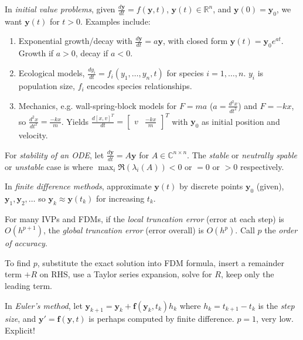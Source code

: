 \documentclass[landscape,10pt,letterpaper]{article}
\begin{document}
\begin{multicols}{4}
In \emph{initial value problems}, given $\frac{d \mathbf{y}}{dt} = f(\mathbf{y}, t)$, $\mathbf{y}(t) \in \mathbb{R}^n$, and $\mathbf{y}(0) = \mathbf{y}_0$, we want $\mathbf{y}(t)$ for $t > 0$.  Examples include:

\begin{enumerate}[topsep=0pt, partopsep=0pt, itemsep=-4pt]
\item Exponential growth/decay with $\frac{d \mathbf{y}}{dt} = a \mathbf{y}$, with closed form $\mathbf{y}(t) = \mathbf{y}_0 e^{at}$.  Growth if $a > 0$, decay if $a < 0$.
\item Ecological models, $\frac{d y_i}{dt} = f_i(y_1, \ldots, y_n, t)$ for species $i = 1, \ldots, n$.  $y_i$ is population size, $f_i$ encodes species relationships.
\item Mechanics, e.g. wall-spring-block models for $F=ma$ ($a = \frac{d^2 x}{dt^2}$) and $F = -kx$, so $\frac{d^2 x}{dt^2} = \frac{-kx}{m}$.  Yields
$\frac{d [x,v]^T}{dt} = \left[ \begin{array}{cc} v & \frac{-kx}{m} \end{array} \right]^T$ with $\mathbf{y}_0$ as initial position and velocity.
\end{enumerate}

For \emph{stability of an ODE}, let $\frac{d \mathbf{y}}{dt} = A \mathbf{y}$ for $A \in \mathbb{C}^{n \times n}$.  The \emph{stable} or \emph{neutrally spable} or \emph{unstable} case is where $\max_i \Re(\lambda_i(A)) < 0$ or $=0$ or $>0$ respectively.

In \emph{finite difference methods}, approximate $\mathbf{y}(t)$ by discrete points $\mathbf{y}_0$ (given), $\mathbf{y}_1, \mathbf{y}_2, \ldots$ so $\mathbf{y}_k \approx \mathbf{y}(t_k)$ for increasing $t_k$.

For many IVPs and FDMs, if the \emph{local truncation error} (error at each step) is $O(h^{p+1})$, the \emph{global truncation error} (error overall) is $O(h^p)$.  Call $p$ the \emph{order of accuracy}.

To find $p$, substitute the exact solution into FDM formula, insert a remainder term $+R$ on RHS, use a Taylor series expansion, solve for $R$, keep only the leading term.

In \emph{Euler's method}, let $\mathbf{y}_{k+1} = \mathbf{y}_k + \mathbf{f}(\mathbf{y}_k, t_k) h_k$ where $h_k = t_{k+1} - t_k$ is the \emph{step size}, and $\mathbf{y}'=\mathbf{f}(\mathbf{y}, t)$ is perhaps computed by finite difference.  $p=1$, very low.  Explicit!



\end{multicols}
\end{document}
